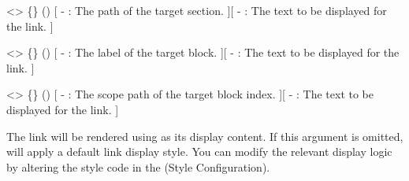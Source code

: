 
<>{
    \{\}
    ()
}[
    -  : The path of the target section.
][
    -  : The text to be displayed for the link.
]

<>{
    \{\}
    ()
}[
    -  : The label of the target block.
][
    -  : The text to be displayed for the link.
]

<>{
    \{\}
    ()
}[
    -  : The scope path of the target block index.
][
    -  : The text to be displayed for the link.
]

The link will be rendered using  as its display content. If this argument is omitted, \SimpleSystemTeX will apply a default link display style. You can modify the relevant display logic by altering the style code in the (Style Configuration).

\newpage

